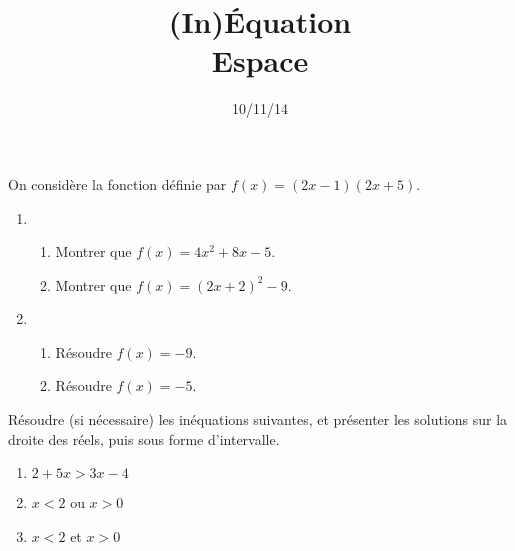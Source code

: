 \documentclass[12pt]{article}
\title{(In)Équation\\Espace}
\date{10/11/14}
\begin{document}
\maketitle

\begin{exercice}
  On considère la fonction définie par $f(x)=\left( 2x-1 \right)\left( 2x+5 \right)$.

  \begin{enumerate}[(1)]
    \item
      \begin{enumerate}
        \item Montrer que $f(x)=4x^2+8x-5$.
        \item Montrer que $f(x)=(2x+2)^2-9$.
      \end{enumerate}
    \item \begin{enumerate}
        \item Résoudre $f(x)=-9$.
        \item Résoudre $f(x)=-5$.
      \end{enumerate}
  \end{enumerate}
\end{exercice}

\begin{exercice}
  Résoudre (si nécessaire) les inéquations suivantes, et présenter les solutions sur la droite des réels, puis sous forme d'intervalle.
  \begin{enumerate}[(1)]
    \item $2+5x>3x-4$
    \item $x<2$ ou $x>0$
    \item $x<2$ et $x>0$
  \end{enumerate}
\end{exercice}

\pagebreak
\end{document}
